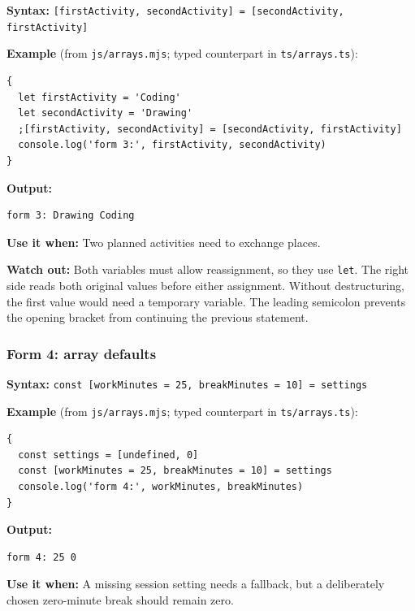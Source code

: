 \documentclass[
  11pt,
]{article}
\newcommand{\passthrough}[1]{#1}
\begin{document}
\textbf{Syntax:}
\passthrough{\lstinline![firstActivity, secondActivity] = [secondActivity, firstActivity]!}

\textbf{Example} (from \passthrough{\lstinline!js/arrays.mjs!}; typed
counterpart in \passthrough{\lstinline!ts/arrays.ts!}):

\begin{lstlisting}
{
  let firstActivity = 'Coding'
  let secondActivity = 'Drawing'
  ;[firstActivity, secondActivity] = [secondActivity, firstActivity]
  console.log('form 3:', firstActivity, secondActivity)
}
\end{lstlisting}

\textbf{Output:}

\begin{lstlisting}
form 3: Drawing Coding
\end{lstlisting}

\textbf{Use it when:} Two planned activities need to exchange places.

\textbf{Watch out:} Both variables must allow reassignment, so they use
\passthrough{\lstinline!let!}. The right side reads both original values
before either assignment. Without destructuring, the first value would
need a temporary variable. The leading semicolon prevents the opening
bracket from continuing the previous statement.

\subsubsection{Form 4: array defaults}\label{form-4-array-defaults}

\textbf{Syntax:}
\passthrough{\lstinline!const [workMinutes = 25, breakMinutes = 10] = settings!}

\textbf{Example} (from \passthrough{\lstinline!js/arrays.mjs!}; typed
counterpart in \passthrough{\lstinline!ts/arrays.ts!}):

\begin{lstlisting}
{
  const settings = [undefined, 0]
  const [workMinutes = 25, breakMinutes = 10] = settings
  console.log('form 4:', workMinutes, breakMinutes)
}
\end{lstlisting}

\textbf{Output:}

\begin{lstlisting}
form 4: 25 0
\end{lstlisting}

\textbf{Use it when:} A missing session setting needs a fallback, but a
deliberately chosen zero-minute break should remain zero.
\end{document}
